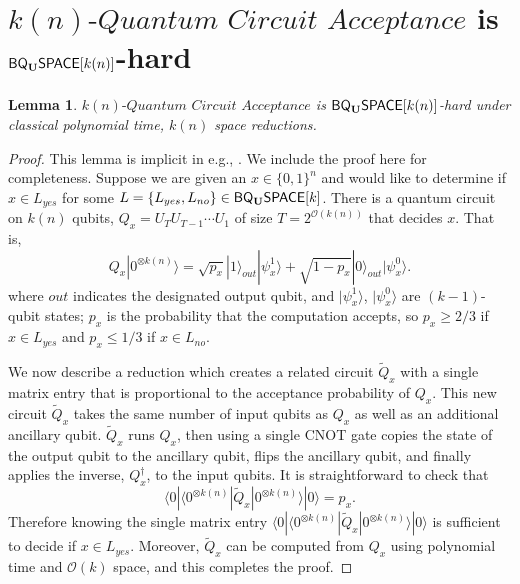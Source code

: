 \documentclass[11pt]{article}
\newtheorem{lemma}[theorem]{Lemma}
\theoremstyle{definition}
\theoremstyle{remark}
\newcommand\qca[1]{\ensuremath{#1}\textit{-Quantum Circuit Acceptance}}
\newcommand{\zero}{\ensuremath{0^{\otimes{k(n)}}}}
\newcommand{\classfont}{\sf}
\newcommand{\Unitary}{\mathbf{U}}
\newcommand{\unitaryBQSPACE}[1]{{\classfont{BQ}_\Unitary\classfont{SPACE}}[#1]}
\begin{document}
\section{$\qca{k(n)}$ is $\unitaryBQSPACE{k(n)}$-hard}\label{app:qca}
\begingroup
\def\thelemma{\ref{lem: quantum circuit acceptance}}
\begin{lemma}
$\qca{k(n)}$ is $\unitaryBQSPACE{k(n)}$-hard under classical polynomial time, $k(n)$ space reductions.
\end{lemma}
\addtocounter{theorem}{-1}
\endgroup

\begin{proof}This lemma is implicit in e.g., \cite{bbbv,dawsonnielsen}.  We include the proof here for completeness.  Suppose we are given an $x\in \{0,1\}^n$ and would like to determine if $x\in L_{yes}$ for some $L=\{L_{yes},L_{no}\}\in\unitaryBQSPACE{k}$.  There is a quantum circuit on $k(n)$ qubits, $Q_x=U_TU_{T-1}\cdots U_1$ of size $T=2^{\mathcal{O}(k(n))}$ that decides $x$.  That is, 
\begin{equation}
Q_x|\zero\rangle = \sqrt{p_x} |1\rangle_{out}|\psi_x^1\rangle + \sqrt{1-p_x} |0\rangle_{out} |\psi_x^0\rangle.
\end{equation}
where $out$ indicates the designated output qubit, and $|\psi_x^1\rangle$, $|\psi_x^0\rangle$ are $(k-1)$-qubit states; $p_x$ is the probability that the computation accepts, so $p_x \ge 2/3$ if $x \in L_{yes}$ and $p_x \le 1/3$ if $x \in L_{no}$.

We now describe a reduction which creates a related circuit $\tilde{Q}_x$ with a single matrix entry that is proportional to the acceptance probability of $Q_x$.  This new circuit $\tilde{Q}_x$ takes the same number of input qubits as $Q_x$ as well as an additional ancillary qubit.  $\tilde{Q}_x$ runs $Q_x$, then using a single CNOT gate copies the state of the output qubit to the ancillary qubit, flips the ancillary qubit, and finally applies the inverse, $Q_x^{\dagger}$, to the input qubits. It is straightforward to check that
\begin{equation}
\langle 0|\langle \zero|\tilde{Q}_x|\zero\rangle|0\rangle = p_x.
\end{equation}
Therefore knowing the single matrix entry $\langle 0|\langle \zero|\tilde{Q}_x|\zero\rangle|0\rangle$ is sufficient to decide if $x \in L_{yes}$. Moreover, $\tilde{Q}_x$ can be computed from $Q_x$ using polynomial time and $\mathcal{O}(k)$ space, and this completes the proof.
\end{proof}
\end{document}
